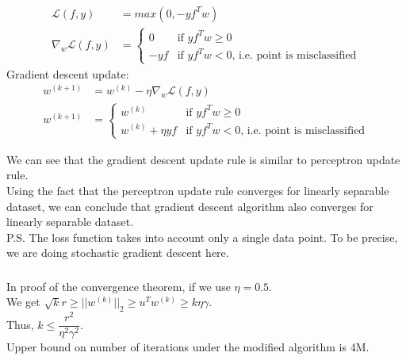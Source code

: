 \documentclass[12pt, fleqn]{article}
\begin{document}
\subsubsection{}
\begin{equation*}
  \begin{aligned}
    \mathcal{L}(f, y)          & = max(0, -y f^T w) \\
    \nabla_w \mathcal{L}(f, y) & =
    \begin{cases}
      0    & \text{if $y f^T w \ge 0$}                            \\
      -y f & \text{if $y f^T w < 0$, i.e. point is misclassified}
    \end{cases}
  \end{aligned}
\end{equation*}
Gradient descent update:
\begin{equation*}
  \begin{aligned}
    w^{(k+1)} & = w^{(k)} - \eta \nabla_w \mathcal{L}(f, y) \\
    w^{(k+1)} & =
    \begin{cases}
      w^{(k)}            & \text{if $y f^T w \ge 0$}                            \\
      w^{(k)} + \eta y f & \text{if $y f^T w < 0$, i.e. point is misclassified}
    \end{cases}
  \end{aligned}
\end{equation*}

We can see that the gradient descent update rule is similar to perceptron update rule. \\
Using the fact that the perceptron update rule converges for linearly separable dataset, we can conclude that gradient descent algorithm also converges for linearly separable dataset. \\

P.S. The loss function takes into account only a single data point. To be precise, we are doing stochastic gradient descent here.

\subsubsection{}
In proof of the convergence theorem, if we use $\eta = 0.5$. \\
We get $\sqrt{k} r \ge ||w^{(k)}||_2 \ge u^T w^{(k)} \ge k \eta \gamma$. \\
Thus, $k \le \dfrac{r^2}{\eta^2 \gamma^2}$. \\
Upper bound on number of iterations under the modified algorithm is 4M. \\
\end{document}
